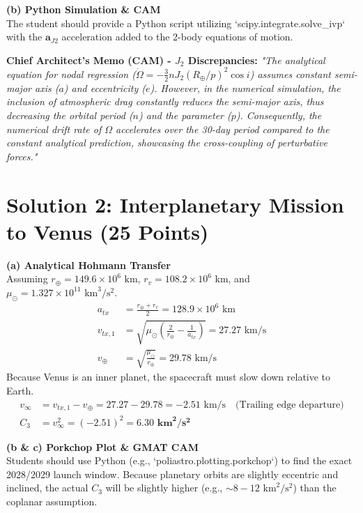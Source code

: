 \documentclass[11pt, letterpaper]{article}
\begin{document}
\textbf{(b) Python Simulation \& CAM} \\
The student should provide a Python script utilizing `scipy.integrate.solve_ivp` with the $\boldsymbol{a}_{J2}$ acceleration added to the 2-body equations of motion.

\textbf{Chief Architect's Memo (CAM) - $J_2$ Discrepancies:} 
\textit{"The analytical equation for nodal regression ($\dot{\Omega} = -\frac{3}{2} n J_2 (R_\oplus/p)^2 \cos i$) assumes constant semi-major axis ($a$) and eccentricity ($e$). However, in the numerical simulation, the inclusion of atmospheric drag constantly reduces the semi-major axis, thus decreasing the orbital period ($n$) and the parameter ($p$). Consequently, the numerical drift rate of $\Omega$ accelerates over the 30-day period compared to the constant analytical prediction, showcasing the cross-coupling of perturbative forces."}

\section*{Solution 2: Interplanetary Mission to Venus (25 Points)}

\textbf{(a) Analytical Hohmann Transfer} \\
Assuming $r_\oplus = 149.6 \times 10^6 \text{ km}$, $r_v = 108.2 \times 10^6 \text{ km}$, and $\mu_\odot = 1.327 \times 10^{11} \text{ km}^3/\text{s}^2$.
\begin{align*}
    a_{tx} &= \frac{r_\oplus + r_v}{2} = 128.9 \times 10^6 \text{ km} \\
    v_{tx,1} &= \sqrt{\mu_\odot \left( \frac{2}{r_\oplus} - \frac{1}{a_{tx}} \right)} = 27.27 \text{ km/s} \\
    v_\oplus &= \sqrt{\frac{\mu_\odot}{r_\oplus}} = 29.78 \text{ km/s}
\end{align*}
Because Venus is an inner planet, the spacecraft must slow down relative to Earth. 
\begin{align*}
    v_\infty &= v_{tx,1} - v_\oplus = 27.27 - 29.78 = -2.51 \text{ km/s} \quad \text{(Trailing edge departure)} \\
    C_3 &= v_\infty^2 = (-2.51)^2 = \mathbf{6.30 \text{ km}^2/\text{s}^2}
\end{align*}

\textbf{(b \& c) Porkchop Plot \& GMAT CAM} \\
Students should use Python (e.g., `poliastro.plotting.porkchop`) to find the exact 2028/2029 launch window. Because planetary orbits are slightly eccentric and inclined, the actual $C_3$ will be slightly higher (e.g., $\sim 8 - 12 \text{ km}^2/\text{s}^2$) than the coplanar assumption. 
\end{document}
